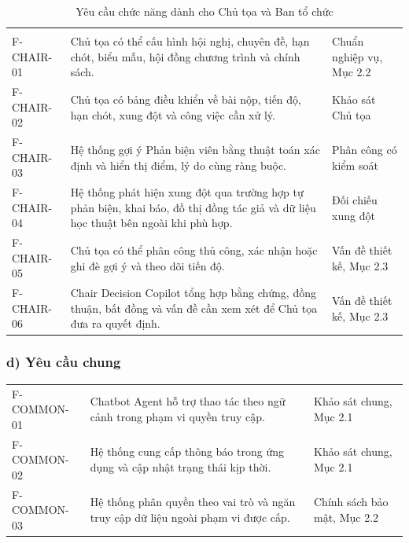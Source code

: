 \begingroup
\setlength{\tabcolsep}{2pt}
\setlength{\LTleft}{0pt plus \textwidth}
\setlength{\LTright}{0pt plus \textwidth}
\begin{longtable}{|C{0.22\textwidth}|P{0.52\textwidth}|P{0.19\textwidth}|}
  \caption{Yêu cầu chức năng dành cho Chủ tọa và Ban tổ chức}\\
\hline
{} &  &  \\ \hline
\endfirsthead
\hline
{} &  &  \\ \hline
\endhead
\hline
\endfoot
F-CHAIR-01 & Chủ tọa có thể cấu hình hội nghị, chuyên đề, hạn chót, biểu mẫu, hội đồng chương trình và chính sách. & Chuẩn nghiệp vụ, Mục 2.2 \\ \hline
F-CHAIR-02 & Chủ tọa có bảng điều khiển về bài nộp, tiến độ, hạn chót, xung đột và công việc cần xử lý. & Khảo sát Chủ tọa \\ \hline
F-CHAIR-03 & Hệ thống gợi ý Phản biện viên bằng thuật toán xác định và hiển thị điểm, lý do cùng ràng buộc. & Phân công có kiểm soát \cite{ch2ref11} \\ \hline
F-CHAIR-04 & Hệ thống phát hiện xung đột qua trường hợp tự phản biện, khai báo, đồ thị đồng tác giả và dữ liệu học thuật bên ngoài khi phù hợp. & Đối chiếu xung đột \cite{ch2ref12,ch2ref13} \\ \hline
F-CHAIR-05 & Chủ tọa có thể phân công thủ công, xác nhận hoặc ghi đè gợi ý và theo dõi tiến độ. & Vấn đề thiết kế, Mục 2.3 \\ \hline
F-CHAIR-06 & Chair Decision Copilot tổng hợp bằng chứng, đồng thuận, bất đồng và vấn đề cần xem xét để Chủ tọa đưa ra quyết định. & Vấn đề thiết kế, Mục 2.3 \\ \hline
\end{longtable}
\endgroup

\subsubsection{d) Yêu cầu chung}

\begin{center}
\setlength{\tabcolsep}{2pt}
\renewcommand{\arraystretch}{1.15}
\begin{tabular}{|C{0.22\textwidth}|P{0.52\textwidth}|P{0.19\textwidth}|}
\hline
{} &  &  \\ \hline
F-COMMON-01 & Chatbot Agent hỗ trợ thao tác theo ngữ cảnh trong phạm vi quyền truy cập. & Khảo sát chung, Mục 2.1 \\ \hline
F-COMMON-02 & Hệ thống cung cấp thông báo trong ứng dụng và cập nhật trạng thái kịp thời. & Khảo sát chung, Mục 2.1 \\ \hline
F-COMMON-03 & Hệ thống phân quyền theo vai trò và ngăn truy cập dữ liệu ngoài phạm vi được cấp. & Chính sách bảo mật, Mục 2.2 \\ \hline
\end{tabular}
\end{center}

